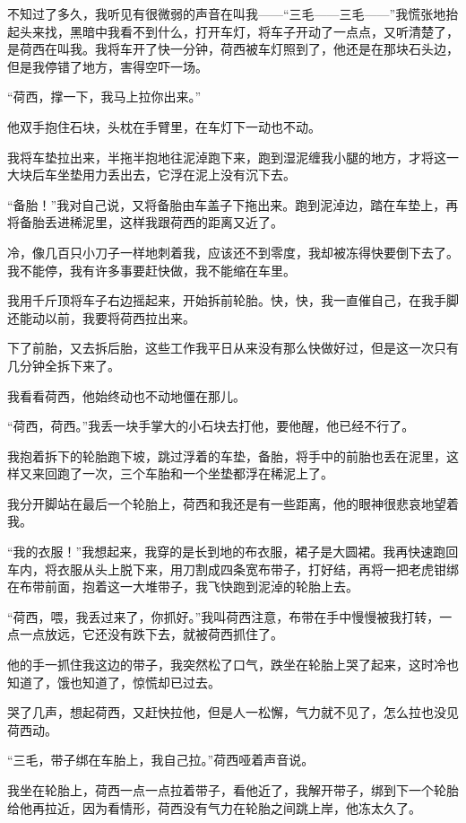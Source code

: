 \par 不知过了多久，我听见有很微弱的声音在叫我——“三毛——三毛——”我慌张地抬起头来找，黑暗中我看不到什么，打开车灯，将车子开动了一点点，又听清楚了，是荷西在叫我。我将车开了快一分钟，荷西被车灯照到了，他还是在那块石头边，但是我停错了地方，害得空吓一场。
\par “荷西，撑一下，我马上拉你出来。”
\par 他双手抱住石块，头枕在手臂里，在车灯下一动也不动。
\par 我将车垫拉出来，半拖半抱地往泥淖跑下来，跑到湿泥缠我小腿的地方，才将这一大块后车坐垫用力丢出去，它浮在泥上没有沉下去。
\par “备胎！”我对自己说，又将备胎由车盖子下拖出来。跑到泥淖边，踏在车垫上，再将备胎丢进稀泥里，这样我跟荷西的距离又近了。
\par 冷，像几百只小刀子一样地刺着我，应该还不到零度，我却被冻得快要倒下去了。我不能停，我有许多事要赶快做，我不能缩在车里。
\par 我用千斤顶将车子右边摇起来，开始拆前轮胎。快，快，我一直催自己，在我手脚还能动以前，我要将荷西拉出来。
\par 下了前胎，又去拆后胎，这些工作我平日从来没有那么快做好过，但是这一次只有几分钟全拆下来了。
\par 我看看荷西，他始终动也不动地僵在那儿。
\par “荷西，荷西。”我丢一块手掌大的小石块去打他，要他醒，他已经不行了。
\par 我抱着拆下的轮胎跑下坡，跳过浮着的车垫，备胎，将手中的前胎也丢在泥里，这样又来回跑了一次，三个车胎和一个坐垫都浮在稀泥上了。
\par 我分开脚站在最后一个轮胎上，荷西和我还是有一些距离，他的眼神很悲哀地望着我。
\par “我的衣服！”我想起来，我穿的是长到地的布衣服，裙子是大圆裙。我再快速跑回车内，将衣服从头上脱下来，用刀割成四条宽布带子，打好结，再将一把老虎钳绑在布带前面，抱着这一大堆带子，我飞快跑到泥淖的轮胎上去。
\par “荷西，喂，我丢过来了，你抓好。”我叫荷西注意，布带在手中慢慢被我打转，一点一点放远，它还没有跌下去，就被荷西抓住了。
\par 他的手一抓住我这边的带子，我突然松了口气，跌坐在轮胎上哭了起来，这时冷也知道了，饿也知道了，惊慌却已过去。
\par 哭了几声，想起荷西，又赶快拉他，但是人一松懈，气力就不见了，怎么拉也没见荷西动。
\par “三毛，带子绑在车胎上，我自己拉。”荷西哑着声音说。
\par 我坐在轮胎上，荷西一点一点拉着带子，看他近了，我解开带子，绑到下一个轮胎给他再拉近，因为看情形，荷西没有气力在轮胎之间跳上岸，他冻太久了。
